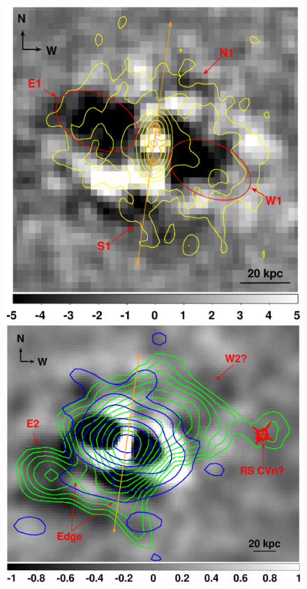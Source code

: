 \begin{figure}
  \begin{center}
    \begin{minipage}{0.495\linewidth}
      \includegraphics*[width=\textwidth, trim=0mm 0mm 0mm 0mm, clip]{sub_inner.ps}
    \end{minipage}
    \begin{minipage}{0.495\linewidth}
      \includegraphics*[width=\textwidth, trim=0mm 0mm 0mm 0mm, clip]{sub_outer.ps}

\end{minipage}
\end{center}
\end{figure}
